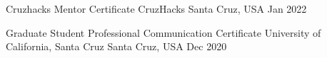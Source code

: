 



\begin{cvhonors}

  \cvhonor
    {Cruzhacks Mentor Certificate} %
    {CruzHacks} %
    {Santa Cruz, USA} %
    {Jan 2022} %

  \cvhonor
    {Graduate Student Professional Communication Certificate} %
    {University of California, Santa Cruz} %
    {Santa Cruz, USA} %
    {Dec 2020} %

\end{cvhonors}
